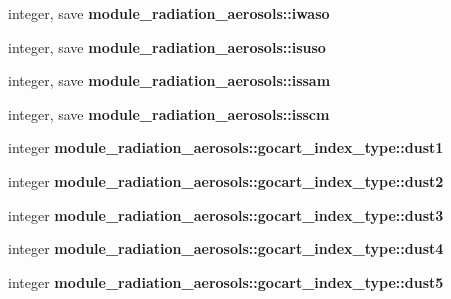 \begin{DoxyCompactItemize}
\mbox{\label{group__module__radiation__aerosols_gad15292f4a185c28ad44687d95ef4d3a4}} 
integer, save {\bfseries module\+\_\+radiation\+\_\+aerosols\+::iwaso}
\item 
\mbox{\label{group__module__radiation__aerosols_gacddb4dccea82201fd3b193c15c85ec78}} 
integer, save {\bfseries module\+\_\+radiation\+\_\+aerosols\+::isuso}
\item 
\mbox{\label{group__module__radiation__aerosols_gab64435256571a80bbb577fc4f27b39ee}} 
integer, save {\bfseries module\+\_\+radiation\+\_\+aerosols\+::issam}
\item 
\mbox{\label{group__module__radiation__aerosols_ga762cff73e22fefab8adf68d08d5c4df1}} 
integer, save {\bfseries module\+\_\+radiation\+\_\+aerosols\+::isscm}
\item 
\mbox{\label{group__module__radiation__aerosols_gae87b7754284ce0d44cab3ab11c7d302d}} 
integer {\bfseries module\+\_\+radiation\+\_\+aerosols\+::gocart\+\_\+index\+\_\+type\+::dust1}
\item 
\mbox{\label{group__module__radiation__aerosols_gaaf95cb5b3df728ac3b333edd8ab7820f}} 
integer {\bfseries module\+\_\+radiation\+\_\+aerosols\+::gocart\+\_\+index\+\_\+type\+::dust2}
\item 
\mbox{\label{group__module__radiation__aerosols_ga5d844db6dd6100b45808b5e19b468a84}} 
integer {\bfseries module\+\_\+radiation\+\_\+aerosols\+::gocart\+\_\+index\+\_\+type\+::dust3}
\item 
\mbox{\label{group__module__radiation__aerosols_ga26a20aa03ac34523cc19644000d4924e}} 
integer {\bfseries module\+\_\+radiation\+\_\+aerosols\+::gocart\+\_\+index\+\_\+type\+::dust4}
\item 
\mbox{\label{group__module__radiation__aerosols_ga7d24acaa59ee8524dd8eca8f91f740c6}} 
integer {\bfseries module\+\_\+radiation\+\_\+aerosols\+::gocart\+\_\+index\+\_\+type\+::dust5}

\end{DoxyCompactItemize}
